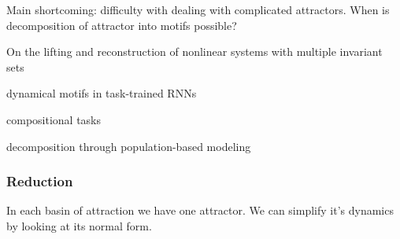 \documentclass{article}
\theoremstyle{definition} \newtheorem{definition}{Definition}  \newtheorem{example}{Example}
\theoremstyle{remark} \newtheorem{remark}{Remark}
\newcounter{ct}
\begin{document}
Main shortcoming: difficulty with dealing with complicated attractors.
When is decomposition of attractor into motifs possible?

On the lifting and reconstruction of nonlinear systems with multiple invariant sets \citep{pan2024lifting}

dynamical motifs in task-trained RNNs \citep{driscoll2024flexible}

compositional tasks \citep{tafazoli2024building}

decomposition through population-based modeling\citep{glaser2020recurrent} 

\citep{mudrik2024decomposed}
\citep{yuste2024ensembles}



\subsubsection{Reduction}\label{sec:reduction} %
In each basin of attraction we have one attractor.
We can simplify it's dynamics by looking at its normal form.
\end{document}
